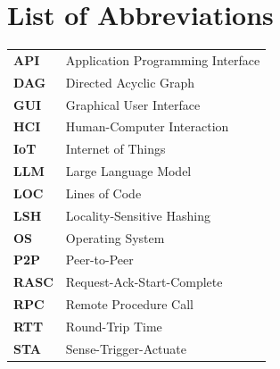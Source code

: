 \clearpage
{}
{}
\section*{List of Abbreviations}
\vspace{0.5em}

\noindent\renewcommand{\arraystretch}{1.3}%
\begin{tabular}{@{}p{2.6cm}l@{}}
\textbf{API}  & Application Programming Interface \\
\textbf{DAG}  & Directed Acyclic Graph \\
\textbf{GUI}  & Graphical User Interface \\
\textbf{HCI}  & Human-Computer Interaction \\
\textbf{IoT}  & Internet of Things \\
\textbf{LLM}  & Large Language Model \\
\textbf{LOC}  & Lines of Code \\
\textbf{LSH}  & Locality-Sensitive Hashing \\
\textbf{OS}   & Operating System \\
\textbf{P2P}  & Peer-to-Peer \\
\textbf{RASC} & Request-Ack-Start-Complete \\
\textbf{RPC}  & Remote Procedure Call \\
\textbf{RTT}  & Round-Trip Time \\
\textbf{STA}  & Sense-Trigger-Actuate \\
\end{tabular}

